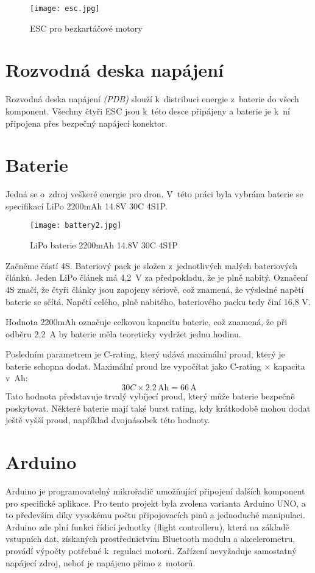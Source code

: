 \documentclass[12pt]{report}
\begin{document}
\begin{figure}[H]
	\centering
	\texttt{[image: esc.jpg]}
	\caption{ESC pro bezkartáčové motory}
	\label{fig:esc.jpg}
\end{figure}

\section{Rozvodná deska napájení}
Rozvodná deska napájení \textit{(PDB)} slouží k~distribuci energie z~baterie do všech komponent. Všechny čtyři ESC jsou k~této desce připájeny a baterie je k~ní připojena přes bezpečný napájecí konektor.

\section[Baterie]{Baterie}
Jedná se o~zdroj veškeré energie pro dron. V~této práci byla vybrána baterie se specifikací LiPo 2200mAh 14.8V 30C 4S1P.

\begin{figure}[H]
	\centering
	\texttt{[image: battery2.jpg]}
	\caption{LiPo baterie 2200mAh 14.8V 30C 4S1P}
	\label{fig:battery2.jpg}
\end{figure}

Začněme částí 4S. Bateriový pack je složen z~jednotlivých malých bateriových článků. Jeden LiPo článek má 4,2~V za předpokladu, že je plně nabitý. Označení 4S značí, že čtyři články jsou zapojeny sériově, což znamená, že výsledné napětí baterie se sčítá. Napětí celého, plně nabitého, bateriového packu tedy činí 16,8 V.

Hodnota 2200mAh označuje celkovou kapacitu baterie, což znamená, že při odběru 2,2~A by baterie měla teoreticky vydržet jednu hodinu.

Posledním parametrem je C-rating, který udává maximální proud, který je baterie schopna dodat. Maximální proud lze vypočítat jako C-rating × kapacita v~Ah:
\[
30C \times 2.2\,\text{Ah} = 66\,\text{A}
\]
Tato hodnota představuje trvalý vybíjecí proud, který může baterie bezpečně poskytovat. Některé baterie mají také burst rating, kdy krátkodobě mohou dodat ještě vyšší proud, například dvojnásobek této hodnoty.

\section[Arduino]{Arduino}
Arduino je programovatelný mikrořadič umožňující připojení dalších komponent pro specifické aplikace. Pro tento projekt byla zvolena varianta Arduino UNO, a to především díky vysokému počtu připojovacích pinů a jednoduché manipulaci. Arduino zde plní funkci řídicí jednotky (flight controlleru), která na základě vstupních dat, získaných prostřednictvím Bluetooth modulu a akcelerometru, provádí výpočty potřebné k~regulaci motorů. Zařízení nevyžaduje samostatný napájecí zdroj, neboť je napájeno přímo z~motorů.
\end{document}
